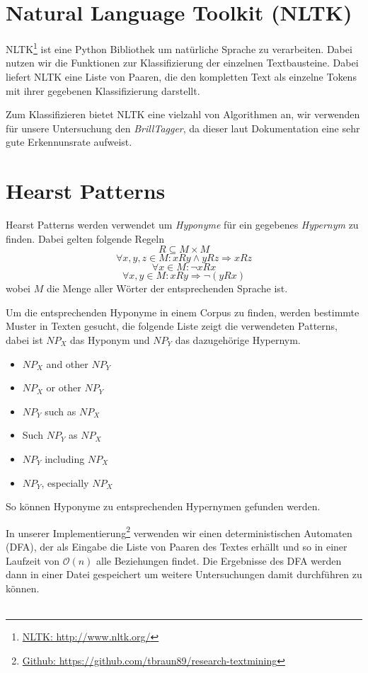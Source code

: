 \section{Natural Language Toolkit (NLTK)}

NLTK\footnote{\href{http://www.nltk.org/}{NLTK: http://www.nltk.org/}} ist eine Python Bibliothek um natürliche Sprache zu verarbeiten.
Dabei nutzen wir die Funktionen zur Klassifizierung der einzelnen
Textbausteine. Dabei liefert NLTK eine Liste von Paaren, die den
kompletten Text als einzelne Tokens mit ihrer gegebenen
Klassifizierung darstellt.

Zum Klassifizieren bietet NLTK eine vielzahl von Algorithmen an, wir
verwenden für unsere Untersuchung den \textit{BrillTagger}, da dieser
laut Dokumentation eine sehr gute Erkennunsrate aufweist.

\section{Hearst Patterns}

Hearst Patterns werden verwendet um \textit{Hyponyme} für ein gegebenes
\textit{Hypernym} zu finden. Dabei gelten folgende Regeln
$$R \subseteq M \times M$$
$$\forall x, y, z \in M : xRy \land yRz \Rightarrow xRz$$
$$\forall x \in M : \neg xRx$$
$$\forall x, y \in M : xRy \Rightarrow \neg (yRx)$$%
%
wobei $M$ die Menge aller Wörter der entsprechenden Sprache ist.

Um die entsprechenden Hyponyme in einem Corpus zu finden, werden
bestimmte Muster in Texten gesucht, die folgende Liste zeigt die
verwendeten Patterns, dabei ist $NP_{X}$ das Hyponym und $NP_{Y}$ das
dazugehörige Hypernym.

\begin{itemize}
\item $NP_{X}$ and other $NP_{Y}$
\item $NP_{X}$ or other $NP_{Y}$
\item $NP_{Y}$ such as $NP_{X}$
\item Such $NP_{Y}$ as $NP_{X}$
\item $NP_{Y}$ including $NP_{X}$
\item $NP_{Y}$, especially $NP_{X}$
\end{itemize}%
%
So können Hyponyme zu entsprechenden Hypernymen gefunden werden.
\cite{Snow:2004}

In unserer
Implementierung\footnote{\href{https://github.com/tbraun89/research-textmining}{Github:
 https://github.com/tbraun89/research-textmining}} verwenden wir einen deterministischen
Automaten (DFA), der als Eingabe die Liste von Paaren des Textes
erhällt und so in einer Laufzeit von $\mathcal{O}(n)$ alle Beziehungen
findet. Die Ergebnisse des DFA werden dann in einer Datei gespeichert
um weitere Untersuchungen damit durchführen zu können.
~\\~\\

